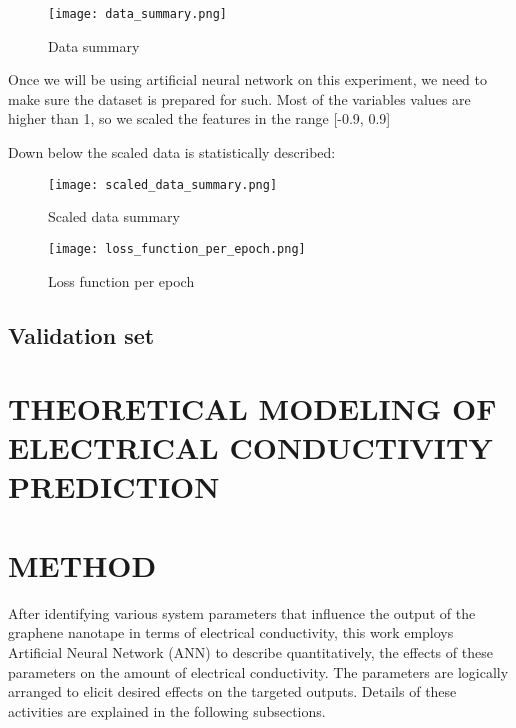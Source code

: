 \documentclass{report}
\begin{document}
\begin{figure}
    \centering
    \texttt{[image: data\_summary.png]}
    \caption{Data summary}
    \label{fig:Data Summary}
\end{figure}

Once we will be using artificial neural network on this experiment, we need to make sure the dataset is prepared for such.
Most of the variables values are higher than 1, so we scaled the features in the range [-0.9, 0.9]

Down below the scaled data is statistically described:

\begin{figure}
    \centering
    \texttt{[image: scaled\_data\_summary.png]}
    \caption{Scaled data summary}
    \label{fig:Scaled data summary}
\end{figure}

\begin{figure}
    \centering
    \texttt{[image: loss\_function\_per\_epoch.png]}
    \caption{Loss function per epoch}
    \label{fig:Loss function per epoch}
\end{figure}

\subsection{Validation set}

\section{THEORETICAL MODELING OF ELECTRICAL CONDUCTIVITY PREDICTION}

\section{METHOD}
After identifying various system parameters that influence the output of the graphene nanotape in terms of electrical conductivity, this work employs Artificial Neural Network (ANN) to describe quantitatively, the effects of these parameters on the amount of electrical conductivity. The parameters are logically arranged to elicit desired effects on the targeted outputs. Details of these activities are explained in the following subsections.
\end{document}
